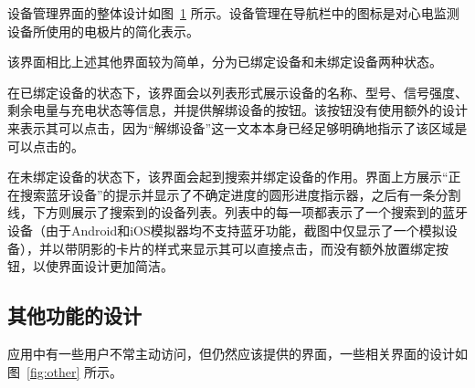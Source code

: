 \begin{figure}[ht]
    \label{fig:device}
\end{figure}

设备管理界面的整体设计如图~\ref{fig:device} 所示。设备管理在导航栏中的图标是对心电监测设备所使用的电极片的简化表示。

该界面相比上述其他界面较为简单，分为已绑定设备和未绑定设备两种状态。

在已绑定设备的状态下，该界面会以列表形式展示设备的名称、型号、信号强度、剩余电量与充电状态等信息，并提供解绑设备的按钮。该按钮没有使用额外的设计来表示其可以点击，因为“解绑设备”这一文本本身已经足够明确地指示了该区域是可以点击的。

在未绑定设备的状态下，该界面会起到搜索并绑定设备的作用。界面上方展示“正在搜索蓝牙设备”的提示并显示了不确定进度的圆形进度指示器，之后有一条分割线，下方则展示了搜索到的设备列表。列表中的每一项都表示了一个搜索到的蓝牙设备（由于Android和iOS模拟器均不支持蓝牙功能，截图中仅显示了一个模拟设备），并以带阴影的卡片的样式来显示其可以直接点击，而没有额外放置绑定按钮，以使界面设计更加简洁。

\subsection{其他功能的设计}\label{subsec:other-design}

应用中有一些用户不常主动访问，但仍然应该提供的界面，一些相关界面的设计如图~\ref{fig:other} 所示。

